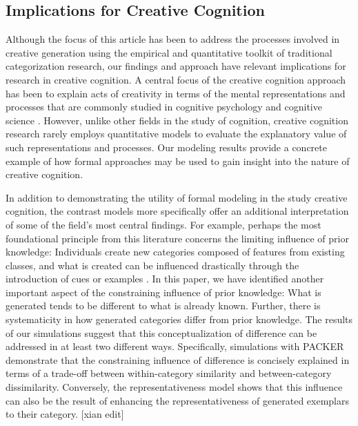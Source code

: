\documentclass[12pt]{article}
\begin{document}
\begin{flushleft}
\subsection{Implications for Creative Cognition}

Although the focus of this article has been to address the processes involved in
creative generation using the empirical and quantitative toolkit of traditional
categorization research, our findings and approach have relevant implications
for research in creative cognition. A central focus of the creative cognition
approach has been to explain acts of creativity in terms of the mental
representations and processes that are commonly studied in cognitive psychology
and cognitive science \citep{finke1992creative,smith1995creative}. However,
unlike other fields in the study of cognition, creative cognition research
rarely employs quantitative models to evaluate the explanatory value of such
representations and processes. Our modeling results provide a concrete example
of how formal approaches may be used to gain insight into the nature of creative
cognition.

In addition to demonstrating the utility of formal modeling in the study
creative cognition, the contrast models more specifically offer an additional
interpretation of some of the field's most central findings. For example,
perhaps the most foundational principle from this literature concerns the
limiting influence of prior knowledge: Individuals create new categories
composed of features from existing classes, and what is created can be
influenced drastically through the introduction of cues or examples
\citep{marsh1999inadvertent,smith1993constraining}. In this paper, we have
identified another important aspect of the constraining influence of prior
knowledge: What is generated tends to be different to what is already known.
Further, there is systematicity in how generated categories differ from prior
knowledge. The results of our simulations suggest that this conceptualization of
difference can be addressed in at least two different ways. Specifically,
simulations with PACKER demonstrate that the constraining influence of
difference is concisely explained in terms of a trade-off between
within-category similarity and between-category dissimilarity. Conversely, the
representativeness model shows that this influence can also be the result of
enhancing the representativeness of generated exemplars to their category. [xian edit]


\end{flushleft}
\end{document}
